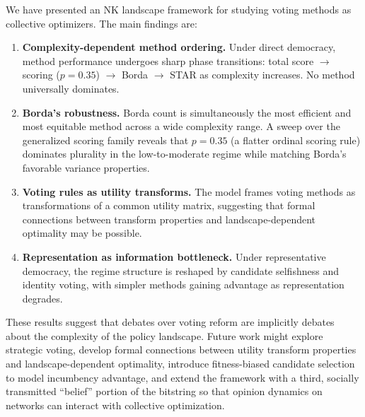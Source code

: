 
We have presented an NK landscape framework for studying voting methods as collective optimizers. The main findings are:

\begin{enumerate}
  \item \textbf{Complexity-dependent method ordering.} Under direct democracy,
    method performance undergoes sharp phase transitions: total score $\to$
    scoring ($p\!=\!0.35$) $\to$ Borda $\to$ STAR as complexity increases. No
    method universally dominates.

  \item \textbf{Borda's robustness.} Borda count is simultaneously the most
    efficient and most equitable method across a wide complexity range. A sweep
    over the generalized scoring family reveals that $p=0.35$ (a flatter
    ordinal scoring rule) dominates plurality in the low-to-moderate regime while matching
    Borda's favorable variance properties.

  \item \textbf{Voting rules as utility transforms.} The model frames voting
    methods as transformations of a common utility matrix, suggesting that formal
    connections between transform properties and landscape-dependent optimality
    may be possible.

  \item \textbf{Representation as information bottleneck.} Under representative
    democracy, the regime structure is reshaped by candidate selfishness and
    identity voting, with simpler methods gaining advantage as representation
    degrades.
\end{enumerate}

These results suggest that debates over voting reform are implicitly debates about the complexity of the policy landscape. Future work might explore strategic voting, develop formal connections between utility transform properties and landscape-dependent optimality, introduce fitness-biased candidate selection to model incumbency advantage, and extend the framework with a third, socially transmitted ``belief'' portion of the bitstring so that opinion dynamics on networks can interact with collective optimization.
